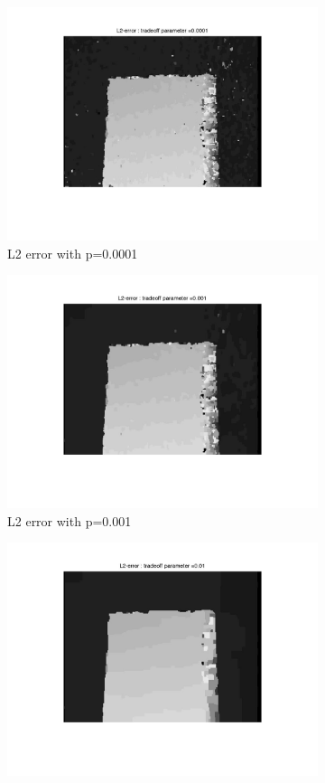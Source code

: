 \documentclass[fleqn]{article}
\begin{document}
\begin{figure}[!ht]
\begin{subfigure}{0.5\textwidth}
\includegraphics[scale=0.2]{./pics/map_L2_error_p=0.0001.jpg}
\caption{L2 error with p=0.0001}
\end{subfigure}
 \begin{subfigure}{0.5\textwidth}
\includegraphics[scale=0.2]{./pics/map_L2_error_p=0.001.jpg}
\caption{L2 error with p=0.001}
\end{subfigure}
 \begin{subfigure}{0.5\textwidth}
\includegraphics[scale=0.2]{./pics/map_L2_error_p=0.01.jpg}

\end{subfigure}
\end{figure}
\end{document}

